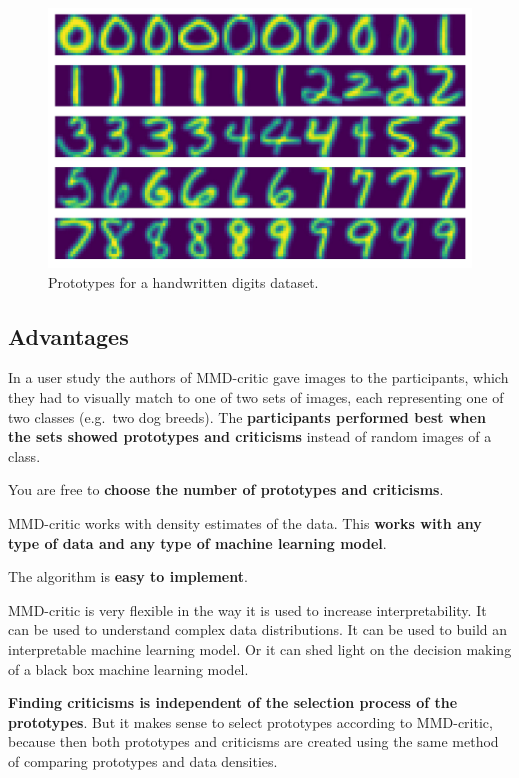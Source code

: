 \documentclass[
  12pt,
]{krantz}
\begin{document}
\begin{figure}

{\centering \includegraphics[width=\textwidth]{images/handwritten-prototypes} 

}

\caption{Prototypes for a handwritten digits dataset.}\label{fig:prototypes-and-criticisms2}
\end{figure}

\hypertarget{advantages-11}{%
\subsection{Advantages}\label{advantages-11}}

In a user study the authors of MMD-critic gave images to the participants, which they had to visually match to one of two sets of images, each representing one of two classes (e.g.~two dog breeds).
The \textbf{participants performed best when the sets showed prototypes and criticisms} instead of random images of a class.

You are free to \textbf{choose the number of prototypes and criticisms}.

MMD-critic works with density estimates of the data.
This \textbf{works with any type of data and any type of machine learning model}.

The algorithm is \textbf{easy to implement}.

MMD-critic is very flexible in the way it is used to increase interpretability.
It can be used to understand complex data distributions.
It can be used to build an interpretable machine learning model.
Or it can shed light on the decision making of a black box machine learning model.

\textbf{Finding criticisms is independent of the selection process of the prototypes}.
But it makes sense to select prototypes according to MMD-critic, because then both prototypes and criticisms are created using the same method of comparing prototypes and data densities.
\end{document}
